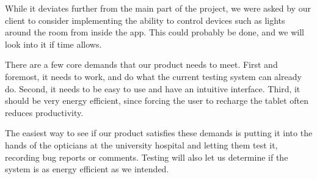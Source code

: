 \documentclass{article}
\begin{document}
While it deviates further from the main part of the project, we were asked by our client to consider implementing the ability to control devices such as lights around the room from inside the app. This could probably be done, and we will look into it if time allows.


There are a few core demands that our product needs to meet. First and foremost, it needs to work, and do what the current testing system can already do. Second, it needs to be easy to use and have an intuitive interface. Third, it should be very energy efficient, since forcing the user to recharge the tablet often reduces productivity. 



The easiest way to see if our product satisfies these demands is putting it into the hands of the opticians at the university hospital and letting them test it, recording bug reports or comments. Testing will also let us determine if the system is as energy efficient as we intended.
\end{document}
